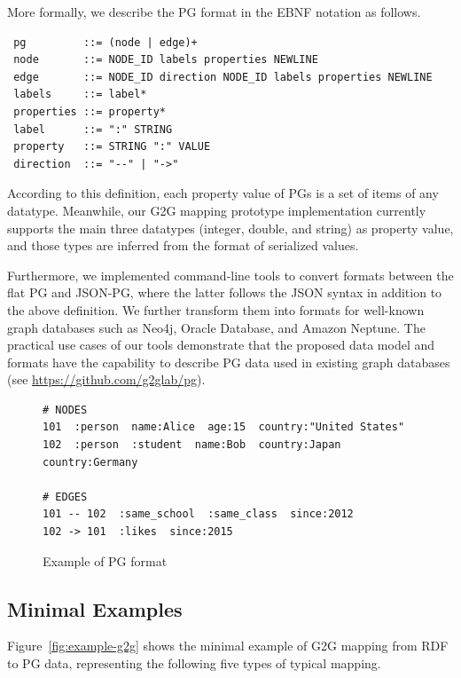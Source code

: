 \documentclass[runningheads]{llncs}
\begin{document}
More formally, we describe the PG format in the EBNF notation as follows.

\begin{defi}
\leavevmode
\begin{verbatim}
 pg         ::= (node | edge)+
 node       ::= NODE_ID labels properties NEWLINE
 edge       ::= NODE_ID direction NODE_ID labels properties NEWLINE
 labels     ::= label*
 properties ::= property*
 label      ::= ":" STRING
 property   ::= STRING ":" VALUE
 direction  ::= "--" | "->"
\end{verbatim}
\end{defi}

According to this definition, each property value of PGs is a set of items of any datatype. Meanwhile, our G2G mapping prototype implementation currently supports the main three datatypes (integer, double, and string) as property value, and those types are inferred from the format of serialized values.

Furthermore, we implemented command-line tools to convert formats between the flat PG and JSON-PG, where the latter follows the JSON syntax in addition to the above definition. We further transform them into formats for well-known graph databases such as Neo4j, Oracle Database, and Amazon Neptune. The practical use cases of our tools demonstrate that the proposed data model and formats have the capability to describe PG data used in existing graph databases (see \url{https://github.com/g2glab/pg}).

\begin{figure}[!t]
\begin{scriptsize}
\begin{verbatim}
# NODES
101  :person  name:Alice  age:15  country:"United States"
102  :person  :student  name:Bob  country:Japan  country:Germany

# EDGES
101 -- 102  :same_school  :same_class  since:2012
102 -> 101  :likes  since:2015
\end{verbatim}
\end{scriptsize}
\caption{Example of PG format}
\label{fig:example-pg}
\end{figure}


\subsection{Minimal Examples}
\label{subsec:minimal-examples}
Figure~\ref{fig:example-g2g} shows the minimal example of G2G mapping from RDF to PG data, representing the following five types of typical mapping.
\end{document}
